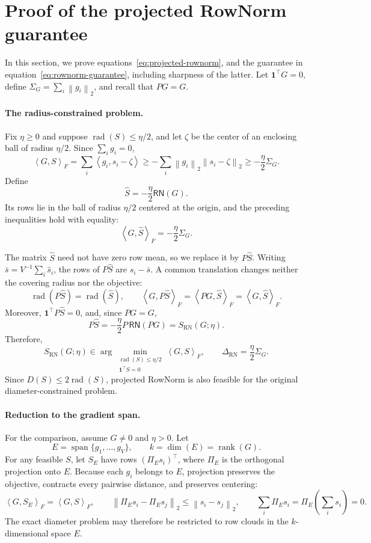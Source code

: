 \documentclass[anon]{opt2026} %
\newcommand{\one}{\mathbf{1}}
\newcommand{\norm}[1]{\left\lVert #1\right\rVert}
\newcommand{\inner}[2]{\left\langle #1,#2\right\rangle}
\DeclareMathOperator{\rank}{rank}
\begin{document}
\section{Proof of the projected RowNorm guarantee}
\label{app:rownorm-proof}

In this section, we prove equations~\ref{eq:projected-rownorm},
and the guarantee in equation~\ref{eq:rownorm-guarantee}, including sharpness of the latter.
Let $\one^\top G=0$, define
$\Sigma_G=\sum_i\norm{g_i}_2$, and recall that $PG=G$.

\paragraph{The radius-constrained problem.}
Fix $\eta\geq0$ and suppose $\operatorname{rad}(S)\leq\eta/2$, and let $\zeta$ be the center of
an enclosing ball of radius $\eta/2$. Since $\sum_i g_i=0$,
\[
\inner{G}{S}_F
=
\sum_i\inner{g_i}{s_i-\zeta}
\geq
-\sum_i\norm{g_i}_2\norm{s_i-\zeta}_2
\geq
-\frac{\eta}{2}\Sigma_G.
\]
Define
\[
\widehat S=-\frac{\eta}{2}\mathsf{RN}(G).
\]
Its rows lie in the ball of radius $\eta/2$ centered at the origin, and the
preceding inequalities hold with equality:
\[
\inner{G}{\widehat S}_F
=
-\frac{\eta}{2}\Sigma_G.
\]

The matrix $\widehat S$ need not have zero row mean, so we replace it by
$P\widehat S$. Writing $\bar s=V^{-1}\sum_i\widehat s_i$, the rows of
$P\widehat S$ are $\widehat s_i-\bar s$. A common translation changes
neither the covering radius nor the objective:
\[
\operatorname{rad}(P\widehat S)
=
\operatorname{rad}(\widehat S),
\qquad
\inner{G}{P\widehat S}_F
=
\inner{PG}{\widehat S}_F
=
\inner{G}{\widehat S}_F.
\]
Moreover, $\one^\top P\widehat S=0$, and, since $PG=G$,
\[
P\widehat S
=
-\frac{\eta}{2}P\,\mathsf{RN}(PG)
=
S_{\mathrm{RN}}(G;\eta).
\]
Therefore,
\[
S_{\mathrm{RN}}(G;\eta)
\in
\arg\min_{\substack{\operatorname{rad}(S)\leq\eta/2\\
                    \one^\top S=0}}
\inner{G}{S}_F,
\qquad
\Delta_{\mathrm{RN}}
=
\frac{\eta}{2}\Sigma_G.
\]
Since $D(S)\leq2\operatorname{rad}(S)$, projected RowNorm is also feasible
for the original diameter-constrained problem.

\paragraph{Reduction to the gradient span.}
For the comparison, assume $G\neq0$ and $\eta>0$. Let
\[
E=\operatorname{span}\{g_1,\ldots,g_V\},
\qquad
k=\dim(E)=\rank(G).
\]
For any feasible $S$, let $S_E$ have rows $(\Pi_Es_i)^\top$, where
$\Pi_E$ is the orthogonal projection onto $E$. Because each $g_i$ belongs
to $E$, projection preserves the objective, contracts every pairwise
distance, and preserves centering:
\[
\inner{G}{S_E}_F=\inner{G}{S}_F,
\qquad
\norm{\Pi_Es_i-\Pi_Es_j}_2
\leq
\norm{s_i-s_j}_2,
\qquad
\sum_i\Pi_Es_i
=
\Pi_E\!\left(\sum_i s_i\right)
=
0.
\]
The exact diameter problem may therefore be restricted to row clouds in the
$k$-dimensional space $E$.
\end{document}

